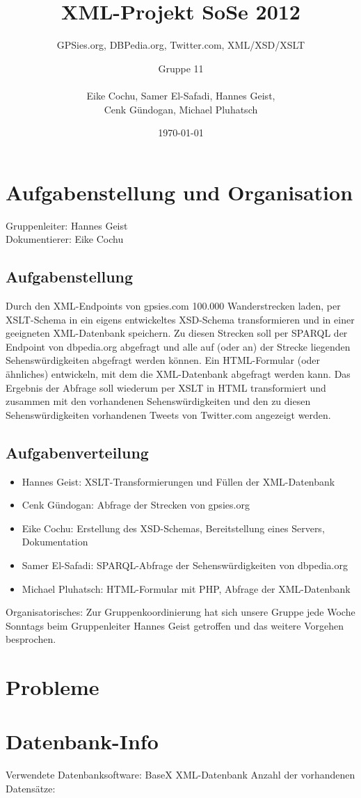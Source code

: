 \documentclass[10pt,a4paper]{scrartcl}
\title{XML-Projekt SoSe 2012}
\subtitle{GPSies.org, DBPedia.org, Twitter.com, XML/XSD/XSLT\vspace*{.7cm}}
\author{Gruppe 11\\\hfill\\Eike Cochu, Samer El-Safadi, Hannes Geist,\\Cenk Gündogan, Michael Pluhatsch}
\date{\today}
\begin{document}
\maketitle
\thispagestyle{empty}
\vspace*{2cm}
\tableofcontents
\newpage
\renewcommand{\baselinestretch}{1.5}
\selectfont

\section{Aufgabenstellung und Organisation}
Gruppenleiter: Hannes Geist\\
Dokumentierer: Eike Cochu

\subsection{Aufgabenstellung}
Durch den XML-Endpoints von gpsies.com 100.000 Wanderstrecken laden, per XSLT-Schema in ein eigens entwickeltes XSD-Schema transformieren und in einer geeigneten XML-Datenbank speichern. Zu diesen Strecken soll per SPARQL der Endpoint von dbpedia.org abgefragt und alle auf (oder an) der Strecke liegenden Sehenswürdigkeiten abgefragt werden können. Ein HTML-Formular (oder ähnliches) entwickeln, mit dem die XML-Datenbank abgefragt werden kann. Das Ergebnis der Abfrage soll wiederum per XSLT in HTML transformiert und zusammen mit den vorhandenen Sehenswürdigkeiten und den zu diesen Sehenswürdigkeiten vorhandenen Tweets von Twitter.com angezeigt werden.

\subsection{Aufgabenverteilung}
\begin{itemize}
\item Hannes Geist: XSLT-Transformierungen und Füllen der XML-Datenbank
\item Cenk Gündogan: Abfrage der Strecken von gpsies.org 
\item Eike Cochu: Erstellung des XSD-Schemas, Bereitstellung eines Servers, Dokumentation
\item Samer El-Safadi: SPARQL-Abfrage der Sehenswürdigkeiten von dbpedia.org
\item Michael Pluhatsch: HTML-Formular mit PHP, Abfrage der XML-Datenbank
\end{itemize}

Organisatorisches: Zur Gruppenkoordinierung hat sich unsere Gruppe jede Woche Sonntags beim Gruppenleiter Hannes Geist getroffen und das weitere Vorgehen besprochen.

\section{Probleme}

\section{Datenbank-Info}
Verwendete Datenbanksoftware: BaseX XML-Datenbank
Anzahl der vorhandenen Datensätze:
\end{document}

